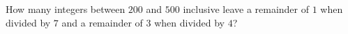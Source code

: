 How many integers between $200$ and $500$ inclusive leave a remainder of $1$ when divided by $7$ and a remainder of $3$ when divided by $4$?
